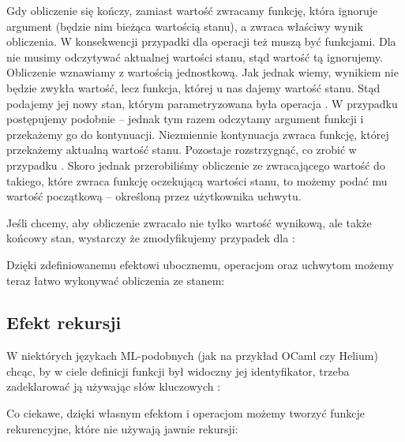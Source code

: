 

Gdy obliczenie się kończy, zamiast wartość zwracamy funkcję, która ignoruje argument (będzie nim bieżąca wartością stanu), a zwraca właściwy wynik obliczenia. W konsekwencji przypadki dla operacji też muszą być funkcjami. Dla  nie musimy odczytywać aktualnej wartości stanu, stąd wartość tą ignorujemy. Obliczenie wznawiamy z wartością jednostkową. Jak jednak wiemy, wynikiem nie będzie zwykła wartość, lecz funkcja, której u nas dajemy wartość stanu. Stąd podajemy jej nowy stan, którym parametryzowana była operacja . W przypadku  postępujemy podobnie -- jednak tym razem odczytamy argument funkcji i przekażemy go do kontynuacji. Niezmiennie kontynuacja zwraca funkcję, której przekażemy aktualną wartość stanu. Pozostaje rozstrzygnąć, co zrobić w przypadku . Skoro jednak przerobiliśmy obliczenie ze zwracającego wartość do takiego, które zwraca funkcję oczekującą wartości stanu, to możemy podać mu wartość początkową -- określoną przez użytkownika uchwytu.

Jeśli chcemy, aby obliczenie zwracało nie tylko wartość wynikową, ale także końcowy stan, wystarczy że zmodyfikujemy przypadek dla :



Dzięki zdefiniowanemu efektowi ubocznemu, operacjom oraz uchwytom możemy teraz łatwo wykonywać obliczenia ze stanem:



\subsection{Efekt rekursji}

W niektórych językach ML-podobnych (jak na przykład OCaml czy Helium) chcąc, by w ciele definicji funkcji był widoczny jej identyfikator, trzeba zadeklarować ją używając słów kluczowych :



Co ciekawe, dzięki własnym efektom i operacjom możemy tworzyć funkcje rekurencyjne, które nie używają jawnie rekursji:



